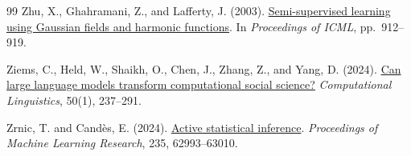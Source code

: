 \documentclass[11pt,a4paper]{article}
\begin{document}
\begin{thebibliography}{99}
Zhu, X., Ghahramani, Z., and Lafferty, J. (2003).
\href{https://mlg.eng.cam.ac.uk/pub/pdf/ZhuGhaLaf03a.pdf}{Semi-supervised learning using Gaussian fields and harmonic functions}.
In \emph{Proceedings of ICML}, pp.~912--919.

Ziems, C., Held, W., Shaikh, O., Chen, J., Zhang, Z., and Yang, D. (2024).
\href{https://doi.org/10.1162/coli_a_00502}{Can large language models transform computational social science?}
\emph{Computational Linguistics}, 50(1), 237--291.

Zrnic, T. and Cand{\`e}s, E. (2024).
\href{https://proceedings.mlr.press/v235/zrnic24a.html}{Active statistical inference}.
\emph{Proceedings of Machine Learning Research}, 235, 62993--63010.

\end{thebibliography}
\endgroup
\end{document}
